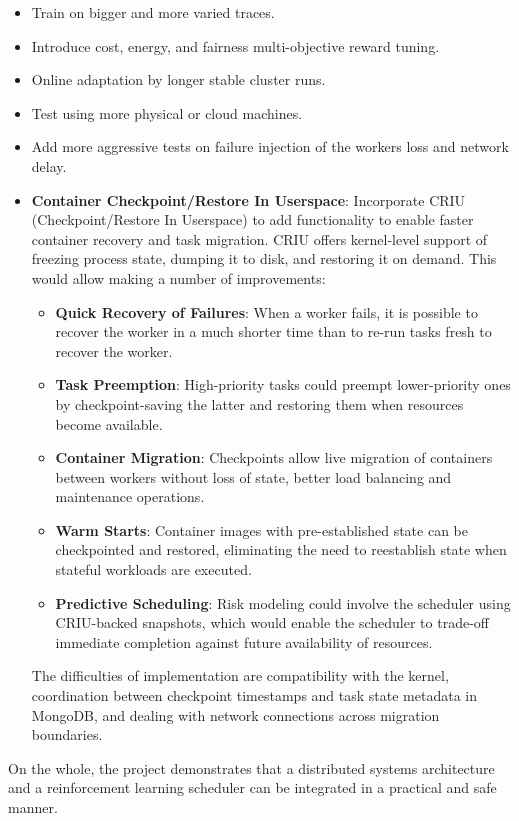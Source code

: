 \begin{itemize}
    \item Train on bigger and more varied traces.
    \item Introduce cost, energy, and fairness multi-objective reward tuning.
    \item Online adaptation by longer stable cluster runs.
    \item Test using more physical or cloud machines.
    \item Add more aggressive tests on failure injection of the workers loss and network delay.
    \item \textbf{Container Checkpoint/Restore In Userspace}: Incorporate CRIU (Checkpoint/Restore In Userspace) to add functionality to enable faster container recovery and task migration. CRIU offers kernel-level support of freezing process state, dumping it to disk, and restoring it on demand. This would allow making a number of improvements:
    \begin{itemize}
        \item \textbf{Quick Recovery of Failures}: When a worker fails, it is possible to recover the worker in a much shorter time than to re-run tasks fresh to recover the worker.
        \item \textbf{Task Preemption}: High-priority tasks could preempt lower-priority ones by checkpoint-saving the latter and restoring them when resources become available.
        \item \textbf{Container Migration}: Checkpoints allow live migration of containers between workers without loss of state, better load balancing and maintenance operations.
        \item \textbf{Warm Starts}: Container images with pre-established state can be checkpointed and restored, eliminating the need to reestablish state when stateful workloads are executed.
        \item \textbf{Predictive Scheduling}: Risk modeling could involve the scheduler using CRIU-backed snapshots, which would enable the scheduler to trade-off immediate completion against future availability of resources.
    \end{itemize}
    The difficulties of implementation are compatibility with the kernel, coordination between checkpoint timestamps and task state metadata in MongoDB, and dealing with network connections across migration boundaries.
\end{itemize}

On the whole, the project demonstrates that a distributed systems architecture and a reinforcement learning scheduler can be integrated in a practical and safe manner.
